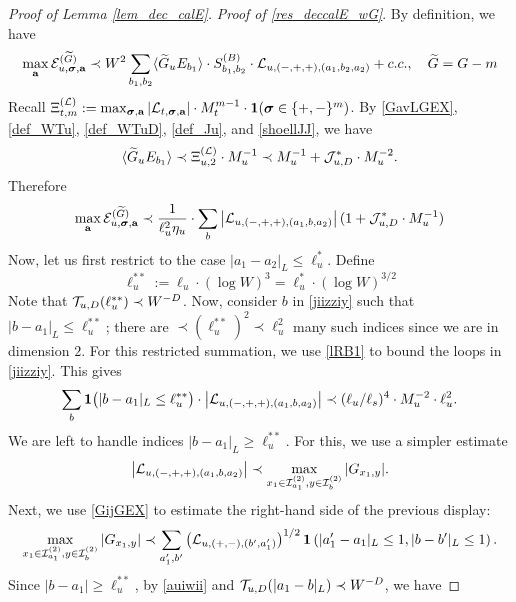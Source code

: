 \begin{proof}[Proof of Lemma \ref{lem_dec_calE}]
 
\medskip
\noindent 
\emph{Proof of   \eqref{res_deccalE_wG}}.    By definition, we  have 
\begin{align}
 \max_{\textbf{a}}{\cal E}^{(\widetilde G)}_{u,  \boldsymbol{\sigma},  \textbf{a} }
 \prec W^{2} \sum_{b_1,b_2} \langle \widetilde G_u E_{b_1}\rangle\cdot S^{(B)}_{b_1,b_2}\cdot  {\cal L}_{u, (-,+,+),(a_1, b_2, a_2)}+c.c.,\quad \widetilde{G}=G-m
 \end{align}
Recall $\Xi^{({\cal L})}_{t,m}:=\max_{\boldsymbol{\sigma},\textbf{a}}|{\cal L}_{t,\boldsymbol{\sigma},\textbf{a}}|\cdot M_{t}^{m-1}\cdot\mathbf{1}(\boldsymbol{\sigma}\in\{+,-\}^{m})$. By \eqref{GavLGEX}, \eqref{def_WTu}, \eqref{def_WTuD}, \eqref{def_Ju}, and \eqref{shoellJJ}, we have 
$$
\langle \widetilde G_u E_{b_1}\rangle\prec \Xi^{(\cal L)}_{u,2}\cdot M_{u}^{-1}\prec  M_{u}^{-1}+ {\cal J}^*_{u,D}\cdot M_{u}^{-2}.
$$
Therefore 
 \begin{align}\label{jiizziy}
\max_{\textbf{a}}{\cal E}^{(\widetilde G)}_{u,  \boldsymbol{\sigma},  \textbf{a} } \prec \frac{1}{ \ell_u^{2}\eta_u} \cdot \sum_{b }   \left|{\cal L}_{u, (-,+,+),(a_1, b , a_2)}\right|(1+{\cal J}^*_{u,D}\cdot M_{u}^{-1})
\end{align}
Now, let us first restrict to the case  $|a_1-a_2|_{L}\le \ell_u^*$. Define 
$$
\ell_u^{**}:= \ell_u\cdot (\log W)^3=\ell^*_u\cdot (\log W)^{3/2}
$$
Note that  ${\cal T}_{u,D}(\ell_u^{**})\prec W^{-D}$. Now, consider $b$ in \eqref{jiizziy} such that $|b-a_1|_{L}\le  \ell_u^{**}$; there are $\prec(\ell_{u}^{**})^{2}\prec\ell_{u}^{2}$ many such indices since we are in dimension $2$. For this restricted summation, we use \eqref{lRB1} to bound the loops in \eqref{jiizziy}. This gives
\begin{align}\label{alkkj}
 \sum_{b }{\bf 1}\big(|b-a_1|_{L}\le  \ell_u^{** }\big)\cdot  \left|{\cal L}_{u, (-,+,+),(a_1, b , a_2)}\right|\prec (\ell_u/\ell_s)^{4}\cdot M_{u}^{-2} \cdot \ell_u^{2}.
\end{align}
We are left to handle indices $|b-a_1|_{L}\ge \ell_u^{**}$. For this, we use a simpler estimate 
 $$
 \left|{\cal L}_{u, (-,+,+),(a_1, b , a_2)}\right|\prec \max_{x_1\in {\cal I}_{a_1}^{(2)},y\in {\cal I}_{b}^{(2)}}|G_{x_1,y}|.
$$
Next, we use \eqref{GijGEX} to estimate the right-hand side of the previous display:
$$
\max_{x_1\in {\cal I}_{a_1}^{(2)},y\in {\cal I}_{b}^{(2)}}|G_{x_1,y}|\prec \sum_{a_1', b'}\left({\cal L}_{u,(+,-),{(b',a_1')}}\right)^{1/2}{\bf1}\left(|a'_1-a_1|_{L}\le 1, |b-b'|_{L}\le 1\right).
$$
Since $|b-a_1|\ge \ell_u^{** }$, by  \eqref{auiwii} and ${\cal T}_{u,D}(|a_1-b|_{L})\prec W^{-D}$, we have  

\end{proof}
